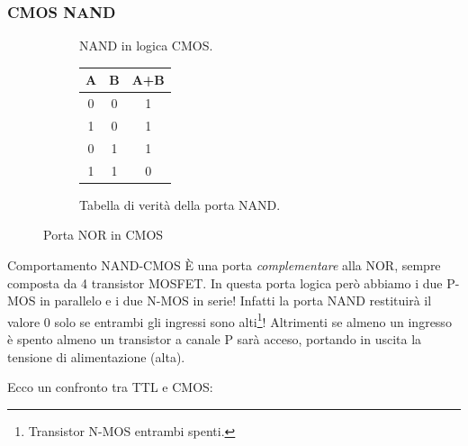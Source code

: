 \documentclass[
]{book}
\begin{document}
\subsubsection{CMOS NAND}\label{cmos-nand}

\begin{figure}[H] 
\centering
\begin{subfigure}{.45\textwidth}

\caption{NAND in logica CMOS.}
\label{fig:subfig1}
\end{subfigure}
\hspace*{\fill}
\begin{subfigure}{.45\textwidth}
\centering
\begin{tabular}{c|c|c}
A & B & A+B  \\ 
\hline
0 & 0 & 1    \\
1 & 0 & 1    \\
0 & 1 & 1    \\
1 & 1 & 0   
\end{tabular}
\caption{Tabella di verità della porta NAND.}
\label{fig:subfig2}\vfill
\end{subfigure}
\caption{Porta NOR in CMOS}
\end{figure}

\begin{orangebox}{Comportamento NAND-CMOS}
È una porta \emph{complementare} alla NOR, sempre composta da 4 transistor MOSFET. In questa porta logica però abbiamo i due P-MOS in parallelo e i due N-MOS in serie! Infatti la porta NAND restituirà il valore 0 solo se entrambi gli ingressi sono alti\footnote{Transistor N-MOS entrambi spenti.}! Altrimenti se almeno un ingresso è spento almeno un transistor a canale P sarà acceso, portando in uscita la tensione di alimentazione (alta).
\end{orangebox}

Ecco un confronto tra TTL e CMOS:
\end{document}
